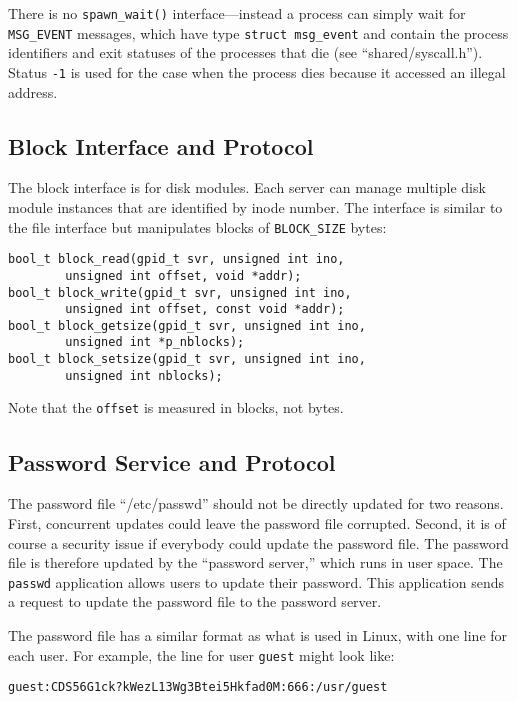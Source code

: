 \documentclass{article}
\begin{document}
There is no \texttt{spawn\_wait()} interface---instead a process can
simply wait for \texttt{MSG\_EVENT} messages, which have type
\texttt{struct msg\_event} and contain the process identifiers and
exit statuses of the processes that die (see ``shared/syscall.h'').
Status \texttt{-1} is used for the case when the process dies
because it accessed an illegal address.

\subsection{Block Interface and Protocol}

The block interface is for disk modules.  Each server
can manage multiple disk module instances that are identified by inode number.
The interface is similar to the file interface but manipulates
blocks of \texttt{BLOCK\_SIZE} bytes:

\begin{verbatim}
bool_t block_read(gpid_t svr, unsigned int ino,
        unsigned int offset, void *addr);
bool_t block_write(gpid_t svr, unsigned int ino,
        unsigned int offset, const void *addr);
bool_t block_getsize(gpid_t svr, unsigned int ino,
        unsigned int *p_nblocks);
bool_t block_setsize(gpid_t svr, unsigned int ino,
        unsigned int nblocks);
\end{verbatim}

Note that the \texttt{offset} is measured in blocks, not bytes.

\subsection{Password Service and Protocol}

The password file ``/etc/passwd'' should not be directly updated for
two reasons.  First, concurrent updates could leave the password file
corrupted.  Second, it is of course a security issue if everybody could
update the password file.  The password file is therefore updated by
the ``password server,'' which runs in user space.  The \texttt{passwd}
application allows users to update their password.  This application
sends a request to update the password file to the password server.

The password file has a similar format as what is used in Linux, with
one line for each user.
For example, the line for user \texttt{guest} might look like:

\begin{verbatim}
guest:CDS56G1ck?kWezL13Wg3Btei5Hkfad0M:666:/usr/guest
\end{verbatim}
\end{document}
